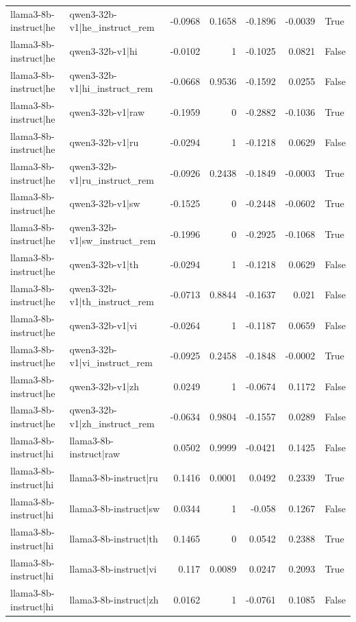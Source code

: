 \begin{table}
\begin{tabular}{l l r r r r l}
llama3-8b-instruct|he & qwen3-32b-v1|he_instruct_rem & -0.0968 & 0.1658 & -0.1896 & -0.0039 & True \\
llama3-8b-instruct|he & qwen3-32b-v1|hi & -0.0102 & 1 & -0.1025 & 0.0821 & False \\
llama3-8b-instruct|he & qwen3-32b-v1|hi_instruct_rem & -0.0668 & 0.9536 & -0.1592 & 0.0255 & False \\
llama3-8b-instruct|he & qwen3-32b-v1|raw & -0.1959 & 0 & -0.2882 & -0.1036 & True \\
llama3-8b-instruct|he & qwen3-32b-v1|ru & -0.0294 & 1 & -0.1218 & 0.0629 & False \\
llama3-8b-instruct|he & qwen3-32b-v1|ru_instruct_rem & -0.0926 & 0.2438 & -0.1849 & -0.0003 & True \\
llama3-8b-instruct|he & qwen3-32b-v1|sw & -0.1525 & 0 & -0.2448 & -0.0602 & True \\
llama3-8b-instruct|he & qwen3-32b-v1|sw_instruct_rem & -0.1996 & 0 & -0.2925 & -0.1068 & True \\
llama3-8b-instruct|he & qwen3-32b-v1|th & -0.0294 & 1 & -0.1218 & 0.0629 & False \\
llama3-8b-instruct|he & qwen3-32b-v1|th_instruct_rem & -0.0713 & 0.8844 & -0.1637 & 0.021 & False \\
llama3-8b-instruct|he & qwen3-32b-v1|vi & -0.0264 & 1 & -0.1187 & 0.0659 & False \\
llama3-8b-instruct|he & qwen3-32b-v1|vi_instruct_rem & -0.0925 & 0.2458 & -0.1848 & -0.0002 & True \\
llama3-8b-instruct|he & qwen3-32b-v1|zh & 0.0249 & 1 & -0.0674 & 0.1172 & False \\
llama3-8b-instruct|he & qwen3-32b-v1|zh_instruct_rem & -0.0634 & 0.9804 & -0.1557 & 0.0289 & False \\
llama3-8b-instruct|hi & llama3-8b-instruct|raw & 0.0502 & 0.9999 & -0.0421 & 0.1425 & False \\
llama3-8b-instruct|hi & llama3-8b-instruct|ru & 0.1416 & 0.0001 & 0.0492 & 0.2339 & True \\
llama3-8b-instruct|hi & llama3-8b-instruct|sw & 0.0344 & 1 & -0.058 & 0.1267 & False \\
llama3-8b-instruct|hi & llama3-8b-instruct|th & 0.1465 & 0 & 0.0542 & 0.2388 & True \\
llama3-8b-instruct|hi & llama3-8b-instruct|vi & 0.117 & 0.0089 & 0.0247 & 0.2093 & True \\
llama3-8b-instruct|hi & llama3-8b-instruct|zh & 0.0162 & 1 & -0.0761 & 0.1085 & False \\

\end{tabular}
\end{table}

